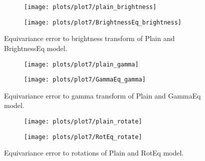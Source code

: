     \begin{figure}[h!]
    \begin{adjustwidth}{-11em}{-11em}
        \centering
        \begin{subfigure}{0.6\textwidth}
            \texttt{[image: plots/plot7/plain\_brightness]}
        \end{subfigure}
        \begin{subfigure}{0.6\textwidth}
            \texttt{[image: plots/plot7/BrightnessEq\_brightness]}
        \end{subfigure}
    \end{adjustwidth}
        \caption{Equivariance error to brightness transform of Plain and BrightnessEq
        model.}
        \label{fig:plot7brightness}
    \end{figure}

    \begin{figure}[h!]
    \begin{adjustwidth}{-11em}{-11em}
        \centering
        \begin{subfigure}{0.5\textwidth}
            \texttt{[image: plots/plot7/plain\_gamma]}
        \end{subfigure}
        \begin{subfigure}{0.5\textwidth}
            \texttt{[image: plots/plot7/GammaEq\_gamma]}
        \end{subfigure}
    \end{adjustwidth}
        \caption{Equivariance error to gamma transform of Plain and GammaEq
        model.}
        \label{fig:plot7gamma}
    \end{figure}

    \begin{figure}[h!]
    \begin{adjustwidth}{-11em}{-11em}
        \centering
        \begin{subfigure}{0.55\textwidth}
            \texttt{[image: plots/plot7/plain\_rotate]}
        \end{subfigure}
        \begin{subfigure}{0.55\textwidth}
            \texttt{[image: plots/plot7/RotEq\_rotate]}
        \end{subfigure}
    \end{adjustwidth}
        \caption{Equivariance error to rotations of Plain and RotEq
        model.}
        \label{fig:plot7rot}
    \end{figure}


